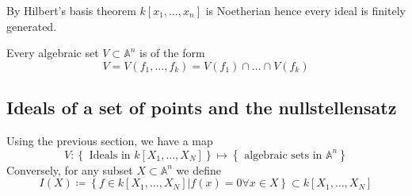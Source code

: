 \documentclass[../main.tex]{subfiles}
\begin{document}
By Hilbert's basis theorem $k [ x_1,\ldots, x_n] $ is Noetherian hence every ideal is finitely generated.\\
\begin{crly}
Every algebraic set $V \subset  \mathbb{A}^{n}$ is of the form 
\[ 
V= V( f_1,\ldots, f_k) = V( f_1) \cap \ldots \cap V( f_k) 
\]

\end{crly}
\subsection{Ideals of a set of points and the nullstellensatz}
Using the previous section, we have a map
\[ 
	V:\left\{ \text{ Ideals in } k[X_1,\ldots, X_N] \right\} \mapsto \left\{ \text{ algebraic sets in } \mathbb{A}^{n} \right\} 
\]
Conversely, for any subset $X \subset \mathbb{A}^{n}$ we define
\[ 
	I( X) \coloneqq \left\{ f\in k[X_1,\ldots,X_N]| f( x) =0\forall x \in X \right\} \subset  k[X_1,\ldots, X_N]
\]
\end{document}
